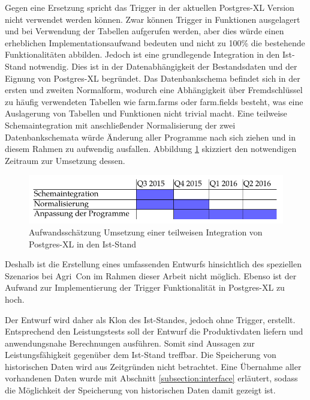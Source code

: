 Gegen eine Ersetzung spricht das Trigger in der aktuellen Postgres-XL Version nicht verwendet werden können.
Zwar können Trigger in Funktionen ausgelagert und bei Verwendung der Tabellen aufgerufen werden, aber dies würde einen erheblichen Implementationsaufwand bedeuten und nicht zu 100\%{} die bestehende Funktionalitäten abbilden.
Jedoch ist eine grundlegende Integration in den Ist-Stand notwendig. %
Dies ist in der Datenabhängigkeit der Bestandsdaten und der Eignung von Postgres-XL begründet.
Das Datenbankschema befindet sich in der ersten und zweiten Normalform, wodurch eine Abhängigkeit über Fremdschlüssel zu häufig verwendeten Tabellen wie farm.farms oder farm.fields besteht, was eine Auslagerung von Tabellen und Funktionen nicht trivial macht.
Eine teilweise Schemaintegration mit anschließender Normalisierung der zwei Datenbankschemata würde Änderung aller Programme nach sich ziehen und in diesem Rahmen zu aufwendig ausfallen.
Abbildung \ref{fig:aufwand} skizziert den notwendigen Zeitraum zur Umsetzung dessen.
\begin{figure}[h!]
\centering
\includegraphics[width=.8\textwidth]{Abbildungen/gantt_aufwand_umsetzung_cropped.pdf}
\caption[Aufwandsschätzung Umsetzung einer teilweisen Integration von Postgres-XL]{Aufwandsschätzung Umsetzung einer teilweisen Integration von Postgres-XL in den Ist-Stand}
\label{fig:aufwand}
\end{figure}
Deshalb ist die Erstellung eines umfassenden Entwurfs hinsichtlich des speziellen Szenarios bei Agri~Con im Rahmen dieser Arbeit nicht möglich.
Ebenso ist der Aufwand zur Implementierung der Trigger Funktionalität in Postgres-XL zu hoch.

Der Entwurf wird daher als Klon des Ist-Standes, jedoch ohne Trigger, erstellt.
Entsprechend den Leistungstests soll der Entwurf die Produktivdaten liefern und anwendungsnahe Berechnungen ausführen.
Somit sind Aussagen zur Leistungsfähigkeit gegenüber dem Ist-Stand treffbar.
Die Speicherung von historischen Daten wird aus Zeitgründen nicht betrachtet.
Eine Übernahme aller vorhandenen Daten wurde mit Abschnitt \ref{subsection:interface} erläutert, sodass die Möglichkeit der Speicherung von historischen Daten damit gezeigt ist.

